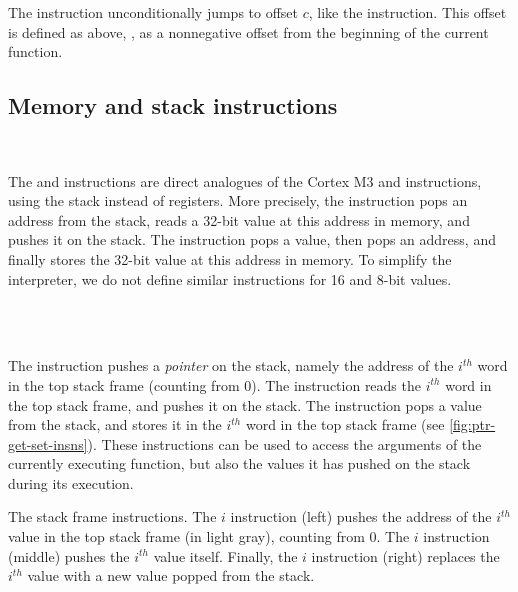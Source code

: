 \begin{Paragraph}
\end{Paragraph}

The  instruction unconditionally jumps to offset $c$, like the
 instruction. This offset is defined as above, \ie, as a nonnegative
offset from the beginning of the current function.

\subsection{Memory and stack instructions}

\begin{Paragraph}[]
\\
\end{Paragraph}

The  and  instructions are direct analogues of the
Cortex M3  and  instructions, using the stack instead of
registers. More precisely, the  instruction pops an address from the
stack, reads a 32-bit value at this address in memory, and pushes it on the
stack. The  instruction pops a value, then pops an address, and
finally stores the 32-bit value at this address in memory. To simplify the
interpreter, we do not define similar instructions for 16 and 8-bit values.

\begin{Paragraph}
\\
\\
\end{Paragraph}

The  instruction pushes a {\em pointer} on the stack, namely the
address of the $i^{th}$ word in the top stack frame (counting from 0). The
 instruction reads the $i^{th}$ word in the top stack frame, and
pushes it on the stack. The  instruction pops a value from the stack,
and stores it in the $i^{th}$ word in the top stack frame (see
\cref{fig:ptr-get-set-insns}). These instructions can be used to access the
arguments of the currently executing function, but also the values it has
pushed on the stack during its execution.

\begin{Figure}
  

  \caption{The stack frame instructions. The  $i$ instruction (left)
  pushes the address of the $i^{th}$ value in the top stack frame (in light
  gray), counting from 0. The  $i$ instruction (middle) pushes the
  $i^{th}$ value itself. Finally, the  $i$ instruction (right)
  replaces the $i ^{th}$ value with a new value popped from the
  stack.}\label{fig:ptr-get-set-insns}
\end{Figure}

